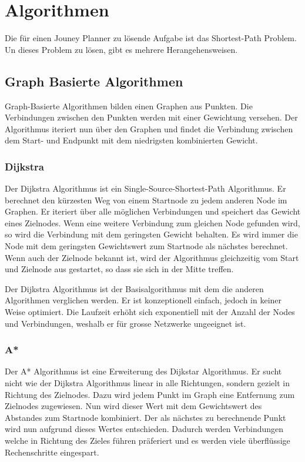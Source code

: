 \section[Algorithmen]{Algorithmen}
\label{sec:Algorithmen}
Die für einen Jouney Planner zu lösende Aufgabe ist das Shortest-Path Problem. Un dieses Problem zu lösen, gibt es mehrere Herangehensweisen. 

\subsection{Graph Basierte Algorithmen}
\label{sec:Graph Basierte Algorithmen}
Graph-Basierte Algorithmen bilden einen Graphen aus Punkten. Die Verbindungen zwischen den Punkten werden mit einer Gewichtung versehen. Der Algorithmus iteriert nun über den Graphen und findet die Verbindung zwischen dem Start- und Endpunkt mit dem niedrigsten kombinierten Gewicht.

\subsubsection{Dijkstra}
\label{sec:Dijkstra}
Der Dijkstra Algorithmus ist ein Single-Source-Shortest-Path Algorithmus. Er berechnet den kürzesten Weg von einem Startnode zu jedem anderen \gls{Node} im Graphen. Er iteriert über alle möglichen Verbindungen und speichert das Gewicht eines Zielnodes. Wenn eine weitere Verbindung zum gleichen Node gefunden wird, so wird die Verbindung mit dem geringsten Gewicht behalten. Es wird immer die Node mit dem geringsten Gewichtswert zum Startnode als nächstes berechnet. Wenn auch der Zielnode bekannt ist, wird der Algorithmus gleichzeitig vom Start und Zielnode aus gestartet, so dass sie sich in der Mitte treffen. 

Der Dijkstra Algorithmus ist der Basisalgorithmus mit dem die anderen Algorithmen verglichen werden. Er ist konzeptionell einfach, jedoch in keiner Weise optimiert. Die Laufzeit erhöht sich exponentiell mit der Anzahl der Nodes und Verbindungen, weshalb er für grosse Netzwerke ungeeignet ist. ~\cite{dij_a} ~\cite{dij_bell}

\subsubsection{A*}
\label{sec:A*}
Der A* Algorithmus ist eine Erweiterung des Dijkstar Algorithmus. Er sucht nicht wie der Dijkstra Algorithmus linear in alle Richtungen, sondern gezielt in Richtung des Zielnodes. Dazu wird jedem Punkt im Graph eine Entfernung zum Zielnodes zugewiesen. Nun wird dieser Wert mit dem Gewichtswert des Abstandes zum Startnode kombiniert. Der als nächstes zu berechnende Punkt wird nun aufgrund dieses Wertes entschieden. Dadurch werden Verbindungen welche in Richtung des Zieles führen präferiert und es werden viele überflüssige Rechenschritte eingespart.

